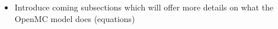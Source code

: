\begin{itemize}
    \item Introduce coming subsections which will offer more details on what the OpenMC model does (equations)
\end{itemize}